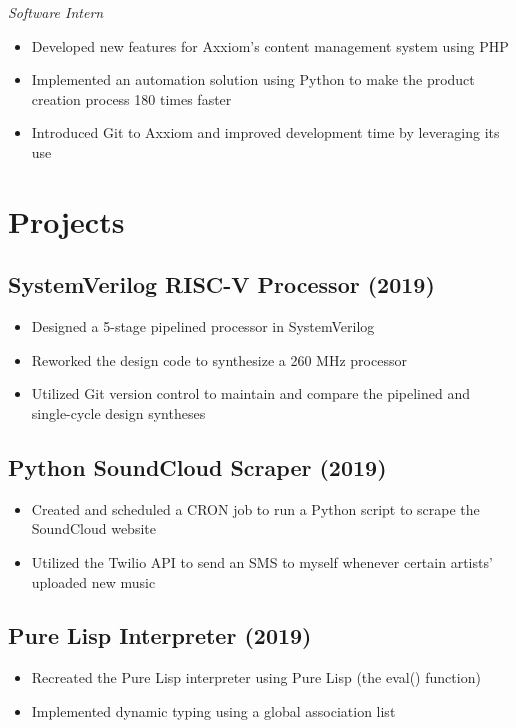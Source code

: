 \documentclass[10pt]{article}
\begin{document}
\noindent\textit{Software Intern}

\begin{itemize}
	\setlength\itemsep{0em}
	\item Developed new features for Axxiom's content management system using PHP
	\item Implemented an automation solution using Python to make the product creation process 180 times faster
	\item Introduced Git to Axxiom and improved development time by leveraging its use
\end{itemize}

\section{Projects}

\subsection{SystemVerilog RISC-V Processor (2019)}

\begin{itemize}
	\setlength\itemsep{0em}
	\item Designed a 5-stage pipelined processor in SystemVerilog
	\item Reworked the design code to synthesize a 260 MHz processor
	\item Utilized Git version control to maintain and compare the pipelined and single-cycle design syntheses
\end{itemize}

\subsection{Python SoundCloud Scraper (2019)}

\begin{itemize}
	\setlength\itemsep{0em}
	\item Created and scheduled a CRON job to run a Python script to scrape the SoundCloud website
	\item Utilized the Twilio API to send an SMS to myself whenever certain artists' uploaded new music
\end{itemize}

\subsection{Pure Lisp Interpreter (2019)}

\begin{itemize}
	\setlength\itemsep{0em}
	\item Recreated the Pure Lisp interpreter using Pure Lisp (the eval() function)
	\item Implemented dynamic typing using a global association list
\end{itemize}
\end{document}
